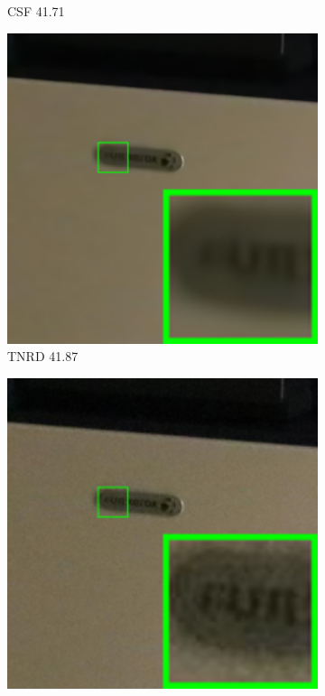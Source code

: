 \begin{figure}
\begin{subfigure}[t]{0.19\textwidth}
\caption{CSF 41.71}
    \end{subfigure}
    \hfill
    \begin{subfigure}[t]{0.19\textwidth}
        \centering
        \includegraphics[width=1\textwidth]{images/guided/our/resize_br_TRD_Canon_80D_ISO12800_IMG_2360_part10.png}
\caption{TNRD 41.87}
    \end{subfigure}
\hfill
    \begin{subfigure}[t]{0.19\textwidth}
        \centering
        \includegraphics[width=1\textwidth]{images/guided/our/resize_br_DnCNN_Canon_80D_ISO12800_IMG_2360_part10.png}

\end{subfigure}
\end{figure}
